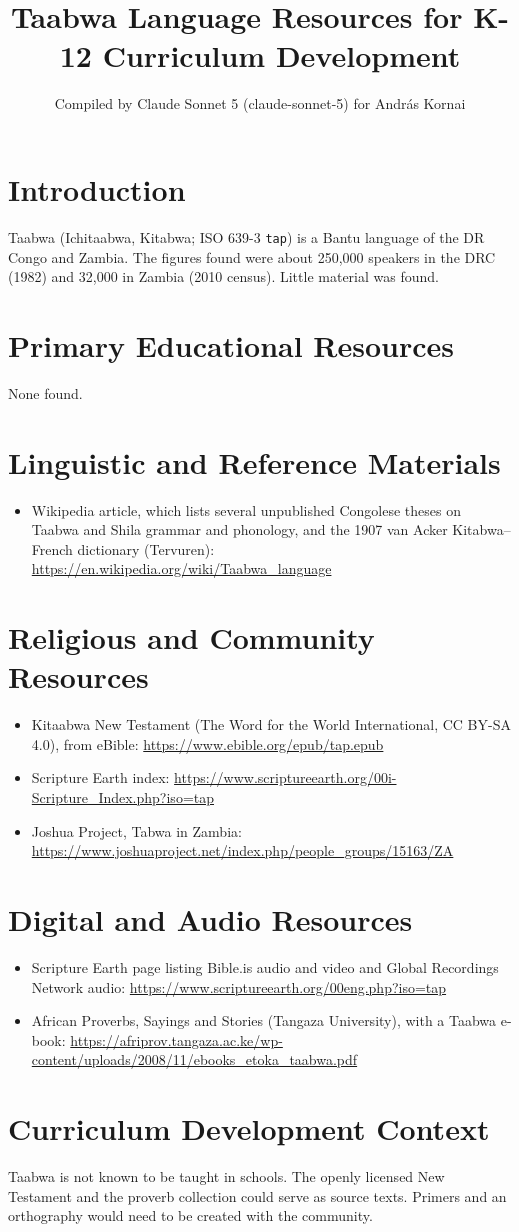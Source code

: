 \documentclass[12pt]{article}
\title{Taabwa Language Resources for K-12 Curriculum Development}
\author{Compiled by Claude Sonnet 5 (claude-sonnet-5) for Andr\'as Kornai}
\date{}
\begin{document}
\maketitle
\section{Introduction}
Taabwa (Ichitaabwa, Kitabwa; ISO 639-3 \texttt{tap}) is a Bantu language of the DR Congo and Zambia. The figures found were about 250,000 speakers in the DRC (1982) and 32,000 in Zambia (2010 census). Little material was found.
\section{Primary Educational Resources}
None found.
\section{Linguistic and Reference Materials}
\begin{itemize}
\item Wikipedia article, which lists several unpublished Congolese theses on Taabwa and Shila grammar and phonology, and the 1907 van Acker Kitabwa--French dictionary (Tervuren): \url{https://en.wikipedia.org/wiki/Taabwa_language}
\end{itemize}
\section{Religious and Community Resources}
\begin{itemize}
\item Kitaabwa New Testament (The Word for the World International, CC BY-SA 4.0), from eBible: \url{https://www.ebible.org/epub/tap.epub}
\item Scripture Earth index: \url{https://www.scriptureearth.org/00i-Scripture_Index.php?iso=tap}
\item Joshua Project, Tabwa in Zambia: \url{https://www.joshuaproject.net/index.php/people_groups/15163/ZA}
\end{itemize}
\section{Digital and Audio Resources}
\begin{itemize}
\item Scripture Earth page listing Bible.is audio and video and Global Recordings Network audio: \url{https://www.scriptureearth.org/00eng.php?iso=tap}
\item African Proverbs, Sayings and Stories (Tangaza University), with a Taabwa e-book: \url{https://afriprov.tangaza.ac.ke/wp-content/uploads/2008/11/ebooks_etoka_taabwa.pdf}
\end{itemize}
\section{Curriculum Development Context}
Taabwa is not known to be taught in schools. The openly licensed New Testament and the proverb collection could serve as source texts. Primers and an orthography would need to be created with the community.
\end{document}
